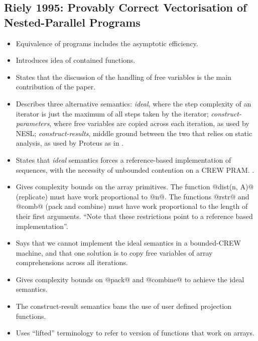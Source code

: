 \subsection{
        \cite{Riley:provably-correct-vectorisation}
        Riely 1995: Provably Correct Vectorisation of Nested-Parallel Programs}
\begin{itemize}
\item	Equivalence of programs includes the asymptotic efficiency.

\item	Introduces idea of contained functions.

\item	States that the discussion of the handling of free variables is the main contribution of the paper.

\item	Describes three alternative semantics: \emph{ideal}, where the step complexity of an iterator is just the maximum of all steps taken by the iterator; \emph{construct-parameters}, where free variables are copied across each iteration, as used by NESL; \emph{construct-results}, middle ground between the two that relies on static analysis, as used by Proteus as in \cite{Palmer:work-efficient-nested-data-parallelism}.

\item	States that \emph{ideal} semantics forces a reference-based implementation of sequences, with the necessity of unbounded contention on a CREW PRAM. .  

\item	Gives complexity bounds on the array primitives. The function @dist(n, A)@ (replicate) must have work proportional to @n@. The functions @rstr@ and @comb@ (pack and combine) must have work proportional to the length of their first arguments. ``Note that these restrictions point to a reference based implementation''. 

\item	Says that we cannot implement the ideal semantics in a bounded-CREW machine, and that one solution is to copy free variables of array comprehensions across all iterations. 

\item	Gives complexity bounds on @pack@ and @combine@ to achieve the ideal semantics.

\item	The construct-result semantics bans the use of user defined projection functions.

\item	Uses ``lifted'' terminology to refer to version of functions that work on arrays.
\end{itemize}


